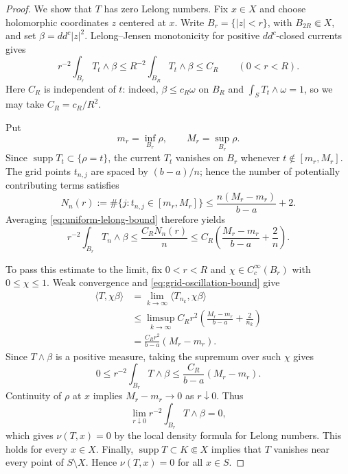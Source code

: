 \documentclass[11pt]{amsart}
\theoremstyle{definition}
\theoremstyle{remark}
\numberwithin{equation}{section}
\newcommand{\ddc}{dd^c}
\newcommand{\supp}{\operatorname{supp}}
\begin{document}
\begin{proof}
We show that $T$ has zero Lelong numbers.
Fix $x\in X$ and choose holomorphic coordinates $z$
centered at $x$. Write $B_r=\{|z|<r\}$, with
$B_{2R}\Subset X$, and set $\beta=\ddc|z|^2$.
Lelong--Jensen monotonicity for positive $\ddc$-closed
currents \cite[Appendix~B, (B.1)--(B.2)]{DNS22} gives
\begin{equation}\label{eq:uniform-lelong-bound}
 r^{-2}\int_{B_r}T_t\wedge\beta
 \le R^{-2}\int_{B_R}T_t\wedge\beta
 \le C_R
 \qquad(0<r<R).
\end{equation}
Here $C_R$ is independent of $t$: indeed,
$\beta\le c_R\omega$ on $B_R$ and
$\int_S T_t\wedge\omega=1$, so we may take
$C_R=c_R/R^2$.

Put
\[
 m_r=\inf_{B_r}\rho,\qquad M_r=\sup_{B_r}\rho.
\]
Since $\supp T_t\subset\{\rho=t\}$, the current $T_t$
vanishes on $B_r$ whenever $t\notin[m_r,M_r]$.
The grid points $t_{n,j}$ are spaced by $(b-a)/n$;
hence the number of potentially contributing terms satisfies
\[
 N_n(r):=\#\{j:t_{n,j}\in[m_r,M_r]\}
 \le \frac{n(M_r-m_r)}{b-a}+2.
\]
Averaging \eqref{eq:uniform-lelong-bound} therefore yields
\begin{equation}\label{eq:grid-oscillation-bound}
 r^{-2}\int_{B_r}T_n\wedge\beta
 \le \frac{C_RN_n(r)}{n}
 \le C_R\left(\frac{M_r-m_r}{b-a}+\frac2n\right).
\end{equation}

To pass this estimate to the limit, fix $0<r<R$ and
$\chi\in C_c^\infty(B_r)$ with $0\le\chi\le1$.
Weak convergence and \eqref{eq:grid-oscillation-bound} give
\[
 \begin{aligned}
 \langle T,\chi\beta\rangle
 &=\lim_{k\to\infty}\langle T_{n_k},\chi\beta\rangle\\
 &\le\limsup_{k\to\infty}
 C_Rr^2\left(\frac{M_r-m_r}{b-a}+\frac2{n_k}\right)\\
 &=\frac{C_Rr^2}{b-a}(M_r-m_r).
 \end{aligned}
\]
Since $T\wedge\beta$ is a positive measure, taking the
supremum over such $\chi$ gives
\begin{equation}\label{eq:limit-oscillation-bound}
 0\le r^{-2}\int_{B_r}T\wedge\beta
 \le\frac{C_R}{b-a}(M_r-m_r).
\end{equation}
Continuity of $\rho$ at $x$ implies
$M_r-m_r\to0$ as $r\downarrow0$. Thus
\[
 \lim_{r\downarrow0}
 r^{-2}\int_{B_r}T\wedge\beta=0,
\]
which gives $\nu(T,x)=0$ by the local density formula
for Lelong numbers. This holds for every $x\in X$.
Finally, $\supp T\subset K\Subset X$ implies that $T$
vanishes near every point of $S\setminus X$.
Hence $\nu(T,x)=0$ for all $x\in S$.
\end{proof}
\end{document}

